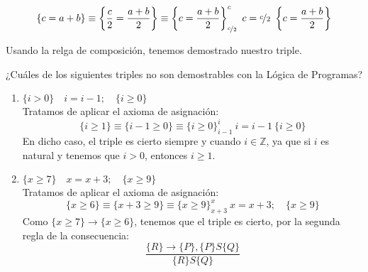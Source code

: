\begin{ejercicio}
\begin{enumerate}
\begin{enumerate}
                    \begin{equation*}
                        \{c=a+b\}\equiv \left\{\frac{c}{2} = \frac{a+b}{2}\right\} \equiv \left\{c=\frac{a+b}{2}\right\}^c_{\nicefrac{c}{2}}\ c=\nicefrac{c}{2}\ \left\{c=\frac{a+b}{2}\right\}
                    \end{equation*}
            \end{enumerate}
            Usando la relga de composición, tenemos demostrado nuestro triple.
    \end{enumerate}
\end{ejercicio}

\begin{ejercicio}
    ¿Cuáles de los siguientes triples no son demostrables con la Lógica de Programas?
    \begin{enumerate}
        \item $\{i > 0\} \quad i = i - 1; \quad \{i \geq 0\}$\\
            Tratamos de aplicar el axioma de asignación:
            \begin{equation*}
                \{i\geq 1\} \equiv \{i-1\geq 0\}\equiv\{i\geq 0\}^i_{i-1}\ i=i-1\ \{i\geq 0\}
            \end{equation*}
            En dicho caso, el triple es cierto siempre y cuando $i \in \mathbb{Z}$, ya que si $i$ es natural y tenemos que $i>0$, entonces $i\geq 1$.
        \item $\{x \geq 7\} \quad x = x + 3; \quad \{x \geq 9\}$\\
            Tratamos de aplicar el axioma de asignación:
            \begin{equation*}
                \{x\geq 6\} \equiv \{x+3\geq 9\} \equiv \{x\geq 9\}^x_{x+3}\ x = x + 3; \quad \{x \geq 9\}
            \end{equation*}
            Como $\{x\geq 7\}\rightarrow\{x\geq 6\}$, tenemos que el triple es cierto, por la segunda regla de la consecuencia:
            \begin{equation*}
                \dfrac{\{R\}\rightarrow\{P\},\{P\}S\{Q\}}{\{R\}S\{Q\}}
            \end{equation*}


\end{enumerate}
\end{ejercicio}
